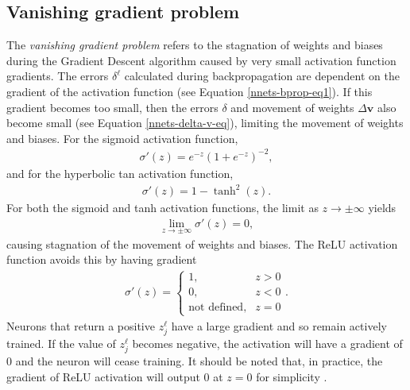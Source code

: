 \subsection*{Vanishing gradient problem}\label{nnet-vanishinggradprob}
The \textit{vanishing gradient problem} refers to the stagnation of weights and biases during the Gradient Descent algorithm caused by very small activation function gradients. The errors $\delta^\ell$ calculated during backpropagation are dependent on the gradient of the activation function (see Equation \eqref{nnets-bprop-eq1}). If this gradient becomes too small, then the errors $\delta$ and movement of weights $\Delta\mathbf{v}$ also become small (see Equation \eqref{nnets-delta-v-eq}), limiting the movement of weights and biases. For the sigmoid activation function,
\begin{align*}
	\sigma'(z) = e^{-z}(1+e^{-z})^{-2},
\end{align*}
and for the hyperbolic tan activation function,
\begin{align*}
	\sigma'(z) = 1-\tanh^2(z).
\end{align*}
For both the sigmoid and tanh activation functions, the limit as $z\rightarrow\pm\infty$ yields 
\begin{align*}
	\lim_{z\rightarrow\pm\infty}\sigma'(z)= 0,
\end{align*}
causing stagnation of the movement of weights and biases. The ReLU activation function avoids this by having gradient
\begin{align*}
	\sigma'(z) = \begin{cases}
		1, & z > 0 \\
		0, & z < 0 \\
		\text{not defined}, & z = 0
	\end{cases}.
\end{align*}
Neurons that return a positive $z_j^\ell$ have a large gradient and so remain actively trained. If the value of $z_j^\ell$ becomes negative, the activation will have a gradient of 0 and the neuron will cease training. It should be noted that, in practice, the gradient of ReLU activation will output 0 at $z = 0$ for simplicity \citep{Goodfellow-et-al-2016}. 



